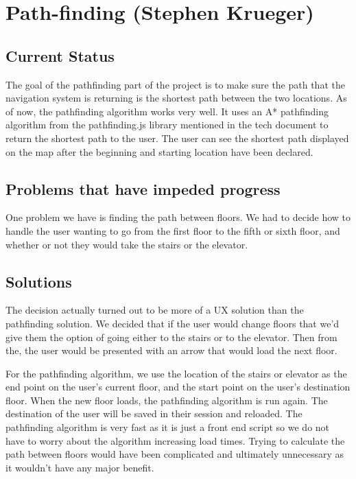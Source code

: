 \documentclass[letterpaper,10pt,titlepage, onecolumn, compsoc]{IEEEtran}
\begin{document}
\section{Path-finding (Stephen Krueger)}
\subsection{Current Status}
The goal of the pathfinding part of the project is to make sure the path that the navigation system is returning is the shortest path between the two locations. As of now, the pathfinding algorithm works very well. It uses an A* pathfinding algorithm from the pathfinding.js library mentioned in the tech document to return the shortest path to the user. The user can see the shortest path displayed on the map after the beginning and starting location have been declared.

\subsection{Problems that have impeded progress}
One problem we have is finding the path between floors. We had to decide how to handle the user wanting to go from the first floor to the fifth or sixth floor, and whether or not they would take the stairs or the elevator.

\subsection{Solutions}
The decision actually turned out to be more of a UX solution than the pathfinding solution. We decided that if the user would change floors that we’d give them the option of going either to the stairs or to the elevator. Then from the, the user would be presented with an arrow that would load the next floor.
 
For the pathfinding algorithm, we use the location of the stairs or elevator as the end point on the user’s current floor, and the start point on the user’s destination floor. When the new floor loads, the pathfinding algorithm is run again. The destination of the user will be saved in their session and reloaded. The pathfinding algorithm is very fast as it is just a front end script so we do not have to worry about the algorithm increasing load times. Trying to calculate the path between floors would have been complicated and ultimately unnecessary as it wouldn’t have any major benefit. 

\end{document}
